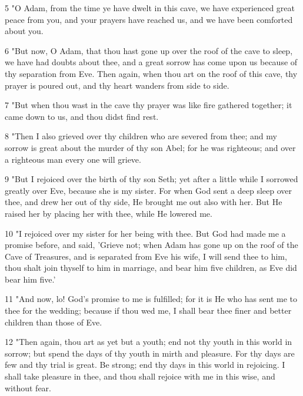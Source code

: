 \par 5 "O Adam, from the time ye have dwelt in this cave, we have experienced great peace from you, and your prayers have reached us, and we have been comforted about you.

\par 6 "But now, O Adam, that thou hast gone up over the roof of the cave to sleep, we have had doubts about thee, and a great sorrow has come upon us because of thy separation from Eve. Then again, when thou art on the roof of this cave, thy prayer is poured out, and thy heart wanders from side to side.

\par 7 "But when thou wast in the cave thy prayer was like fire gathered together; it came down to us, and thou didst find rest.

\par 8 "Then I also grieved over thy children who are severed from thee; and my sorrow is great about the murder of thy son Abel; for he was righteous; and over a righteous man every one will grieve.

\par 9 "But I rejoiced over the birth of thy son Seth; yet after a little while I sorrowed greatly over Eve, because she is my sister. For when God sent a deep sleep over thee, and drew her out of thy side, He brought me out also with her. But He raised her by placing her with thee, while He lowered me.

\par 10 "I rejoiced over my sister for her being with thee. But God had made me a promise before, and said, 'Grieve not; when Adam has gone up on the roof of the Cave of Treasures, and is separated from Eve his wife, I will send thee to him, thou shalt join thyself to him in marriage, and bear him five children, as Eve did bear him five.'

\par 11 "And now, lo! God's promise to me is fulfilled; for it is He who has sent me to thee for the wedding; because if thou wed me, I shall bear thee finer and better children than those of Eve.

\par 12 "Then again, thou art as yet but a youth; end not thy youth in this world in sorrow; but spend the days of thy youth in mirth and pleasure. For thy days are few and thy trial is great. Be strong; end thy days in this world in rejoicing. I shall take pleasure in thee, and thou shall rejoice with me in this wise, and without fear.

